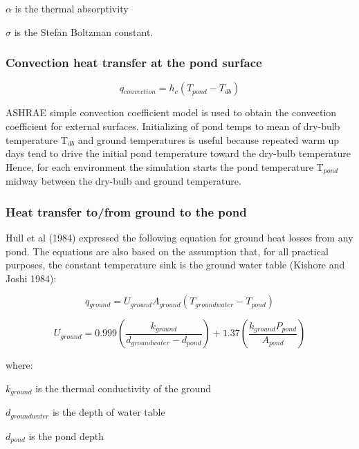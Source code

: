 \(\alpha\) is the thermal absorptivity

\(\sigma\) is the Stefan Boltzman constant.

\subsubsection{Convection heat transfer at the pond surface}\label{convection-heat-transfer-at-the-pond-surface}

\begin{equation}
q{}_{convection} = h{}_c(T{}_{pond} - T{}_{db})
\end{equation}

ASHRAE simple convection coefficient model is used to obtain the convection coefficient for external surfaces. Initializing of pond temps to mean of dry-bulb temperature T\(_{db}\) and ground temperatures is useful because repeated warm up days tend to drive the initial pond temperature toward the dry-bulb temperature Hence, for each environment the simulation starts the pond temperature T\(_{pond}\) midway between the dry-bulb and ground temperature.

\subsubsection{Heat transfer to/from ground to the pond}\label{heat-transfer-tofrom-ground-to-the-pond}

Hull et al (1984) expressed the following equation for ground heat losses from any pond. The equations are also based on the assumption that, for all practical purposes, the constant temperature sink is the ground water table (Kishore and Joshi 1984):

\begin{equation}
q{}_{ground} = U{}_{ground}A{}_{ground}(T{}_{groundwater} - T{}_{pond})
\end{equation}

\begin{equation}
U{}_{ground} = 0.999\left( {\frac{{k{}_{ground}}}{{d{}_{groundwater} - d{}_{pond}}}} \right) + 1.37\left( {\frac{{k{}_{ground}P{}_{pond}}}{{A{}_{pond}}}} \right)
\end{equation}

where:

\(k{}_{ground}\) is the thermal conductivity of the ground

\(d{}_{groundwater}\) is the depth of water table

\(d{}_{pond}\) is the pond depth

